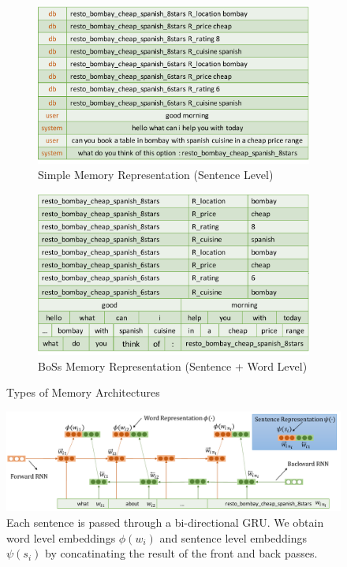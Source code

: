 \begin{figure}
\centering
\begin{subfigure}{0.8\textwidth}
 \includegraphics[width=\linewidth]{assets/figures/memory_flat.pdf}
 \caption{Simple Memory Representation (Sentence Level)}\label{fig:flatMemory}
\end{subfigure}

\vspace*{0.5in}

\begin{subfigure}{0.8\textwidth}
 \includegraphics[width=\linewidth]{assets/figures/memory_hier.pdf}
 \caption{{\sc BoSs} Memory Representation (Sentence + Word Level)}\label{fig:hierMemory}
\end{subfigure}
\caption{Types of Memory Architectures}
\end{figure}

\begin{figure}[t]
\centering
\includegraphics[scale=0.5]{assets/figures/embedding.pdf}
\caption{Each sentence is passed through a bi-directional GRU. We obtain word level embeddings $\phi(w_i)$ and sentence level embeddings $\psi(s_i)$ by concatinating the result of the front and back passes.}
\label{fig:embed}
\end{figure}

